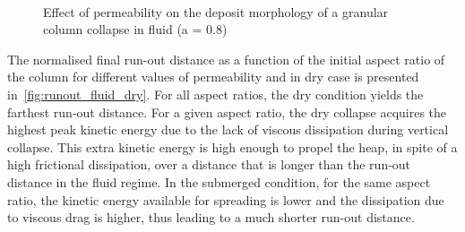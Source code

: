 \begin{figure}
\\
\caption{Effect of permeability on the deposit morphology of a granular column 
collapse in fluid (a = 0.8)}
\label{fig:a08_dense_snapshots}
\end{figure}

The normalised final run-out distance as a function of the initial aspect ratio 
of the column for different values of permeability and in dry case is presented 
in~\cref{fig:runout_fluid_dry}. For all aspect ratios, the dry condition yields 
the farthest run-out distance. For a given aspect ratio, the dry collapse 
acquires the highest peak kinetic energy due to the lack of viscous dissipation 
during vertical collapse. This extra kinetic energy is high enough to propel 
the heap, in spite of a high frictional dissipation, over a distance that is 
longer than the run-out distance in the fluid regime. In the submerged 
condition, for the same aspect ratio, the kinetic energy available for 
spreading is lower and the dissipation due to viscous drag is higher, thus 
leading to a much shorter run-out distance. 


